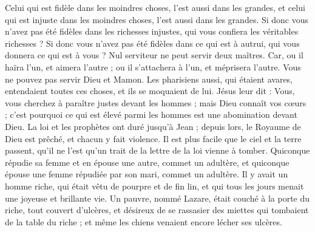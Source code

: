 \begin{multicols}{2}
Celui qui est fidèle dans les moindres choses, l'est aussi dans les grandes, et celui qui est injuste dans les moindres choses, l'est aussi dans les grandes.
Si donc vous n'avez pas été fidèles dans les richesses injustes, qui vous confiera les véritables richesses ?
Si donc vous n'avez pas été fidèles dans ce qui est à autrui, qui vous donnera ce qui est à vous ?
Nul serviteur ne peut servir deux maîtres. Car, ou il haïra l'un, et aimera l'autre ; ou il s'attachera à l'un, et méprisera l'autre. Vous ne pouvez pas servir Dieu et Mamon.
Les pharisiens aussi, qui étaient avares, entendaient toutes ces choses, et ils se moquaient de lui.
Jésus leur dit : Vous, vous cherchez à paraître justes devant les hommes ; mais Dieu connaît vos cœurs ; c'est pourquoi ce qui est élevé parmi les hommes est une abomination devant Dieu.
La loi et les prophètes ont duré jusqu'à Jean ; depuis lors, le Royaume de Dieu est prêché, et chacun y fait violence.
Il est plus facile que le ciel et la terre passent, qu'il ne l'est qu'un trait de la lettre de la loi vienne à tomber.
Quiconque répudie sa femme et en épouse une autre, commet un adultère, et quiconque épouse une femme répudiée par son mari, commet un adultère.
Il y avait un homme riche, qui était vêtu de pourpre et de fin lin, et qui tous les jours menait une joyeuse et brillante vie.
Un pauvre, nommé Lazare, était couché à la porte du riche, tout couvert d'ulcères,
et désireux de se rassasier des miettes qui tombaient de la table du riche ; et même les chiens venaient encore lécher ses ulcères.

\end{multicols}

